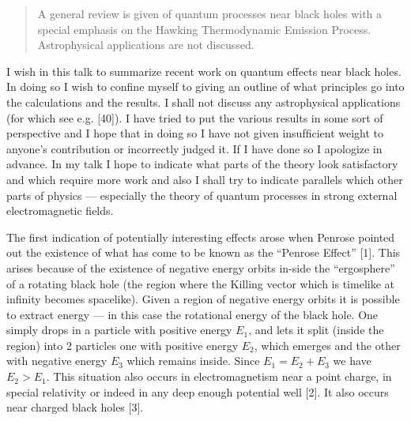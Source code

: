 \begin{abstract}
A general review is given of quantum processes near black holes with
a special emphasis on the Hawking Thermodynamic Emission Process. Astrophysical
applications are not discussed.
\end{abstract}

\bigskip

\ni
I wish in this talk to summarize recent work on quantum effects near
black holes. In doing so I wish to conﬁne myself to giving an outline of what
principles go into the calculations and the results. I shall not discuss any
astrophysical applications
(for which see e.g. [40]). I have tried to put the
various results in some sort of perspective and I hope that in doing so I have not given
insufﬁcient weight to anyone's contribution or incorrectly judged it.
If I have done so I apologize in advance. In my talk I hope to indicate what parts of the
theory look satisfactory and which require more work and also I
shall try to indicate parallels which other parts of physics --- especially
the theory of quantum processes in strong external electromagnetic fields.

The first indication of potentially interesting effects arose when Penrose pointed out 
the existence of what has come to be known as the ``Penrose Effect'' [1]. 
This arises because of the existence of negative energy orbits in-side the ``ergosphere''
of a rotating black hole (the region where the Killing vector which is timelike at
infinity becomes spacelike). Given a region of negative energy orbits it is possible to
extract energy --- in this case the rotational energy of the black hole. 
One simply drops in a particle with positive energy $E_1$, and lets it split (inside the region) into 
2 particles one with positive energy
$E_2$, which emerges and the other with negative energy $E_3$ which remains inside.
Since $E_1 = E_2 + E_3$ we have $E_2 > E_1$. This situation also occurs in electromagnetism
near a point charge, in special relativity or indeed in any deep enough potential well [2].
It also occurs near charged black holes [3].

